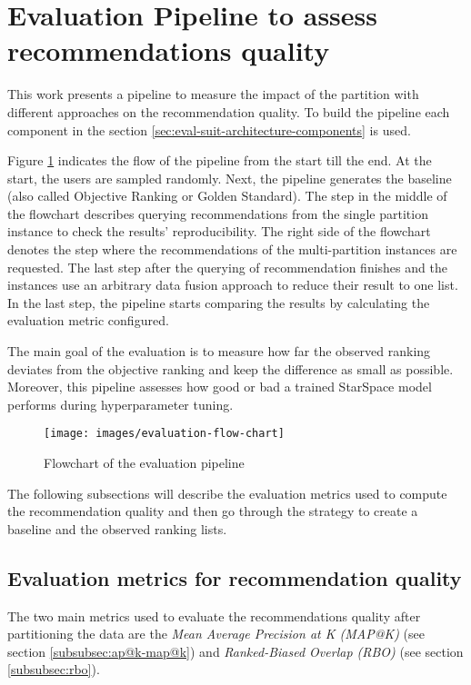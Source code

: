 \section{Evaluation Pipeline to assess recommendations quality}
\label{sec:evaluation-pipeline}
This work presents a pipeline to measure the impact of the partition with different approaches on the recommendation quality. To build the pipeline each component in the section \ref{sec:eval-suit-architecture-components} is used. 

Figure \ref{fig:flowchart-evaluation-pipeline} indicates the flow of the pipeline from the start till the end. At the start, the users are sampled randomly. Next, the pipeline generates the baseline (also called Objective Ranking or Golden Standard). The step in the middle of the flowchart describes querying recommendations from the single partition instance to check the results' reproducibility. The right side of the flowchart denotes the step where the recommendations of the multi-partition instances are requested. The last step after the querying of recommendation finishes and the instances use an arbitrary data fusion approach to reduce their result to one list. In the last step, the pipeline starts comparing the results by calculating the evaluation metric configured. 

The main goal of the evaluation is to measure how far the observed ranking deviates from the objective ranking and keep the difference as small as possible. Moreover, this pipeline assesses how good or bad a trained StarSpace model performs during hyperparameter tuning.

\begin{figure}[!h]
    \centering
    \texttt{[image: images/evaluation-flow-chart]}
    \caption{Flowchart of the evaluation pipeline}
    \label{fig:flowchart-evaluation-pipeline}
\end{figure}


The following subsections will describe the evaluation metrics used to compute the recommendation quality and then go through the strategy to create a baseline and the observed ranking lists.

\subsection{Evaluation metrics for recommendation quality}
\label{subsec:evaluation-metrics-for-recommendation-quality}
The two main metrics used to evaluate the recommendations quality after partitioning the data are the \emph{Mean Average Precision at K (MAP@K)} (see section \ref{subsubsec:ap@k-map@k})  and \emph{Ranked-Biased Overlap (RBO)} (see section \ref{subsubsec:rbo}). 



